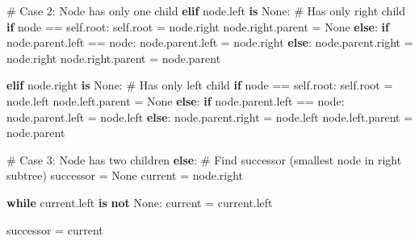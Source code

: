\documentclass[
  nswissgerman,
  a4paper,
  DIV=11,
  numbers=noendperiod,
  ngerman]{scrreprt}
\newenvironment{Shaded}{\begin{snugshade}}{\end{snugshade}}
\newcommand{\CommentTok}[1]{\textcolor[rgb]{0.37,0.37,0.37}{#1}}
\newcommand{\ControlFlowTok}[1]{\textcolor[rgb]{0.00,0.23,0.31}{\textbf{#1}}}
\newcommand{\KeywordTok}[1]{\textcolor[rgb]{0.00,0.23,0.31}{\textbf{#1}}}
\newcommand{\NormalTok}[1]{\textcolor[rgb]{0.00,0.23,0.31}{#1}}
\newcommand{\OperatorTok}[1]{\textcolor[rgb]{0.37,0.37,0.37}{#1}}
\newcommand{\VariableTok}[1]{\textcolor[rgb]{0.07,0.07,0.07}{#1}}
\begin{document}
\begin{Shaded}
\begin{Highlighting}[numbers=left,,]
        \CommentTok{\# Case 2: Node has only one child}
        \ControlFlowTok{elif}\NormalTok{ node.left }\KeywordTok{is} \VariableTok{None}\NormalTok{:  }\CommentTok{\# Has only right child}
            \ControlFlowTok{if}\NormalTok{ node }\OperatorTok{==} \VariableTok{self}\NormalTok{.root:}
                \VariableTok{self}\NormalTok{.root }\OperatorTok{=}\NormalTok{ node.right}
\NormalTok{                node.right.parent }\OperatorTok{=} \VariableTok{None}
            \ControlFlowTok{else}\NormalTok{:}
                \ControlFlowTok{if}\NormalTok{ node.parent.left }\OperatorTok{==}\NormalTok{ node:}
\NormalTok{                    node.parent.left }\OperatorTok{=}\NormalTok{ node.right}
                \ControlFlowTok{else}\NormalTok{:}
\NormalTok{                    node.parent.right }\OperatorTok{=}\NormalTok{ node.right}
\NormalTok{                node.right.parent }\OperatorTok{=}\NormalTok{ node.parent}
        
        \ControlFlowTok{elif}\NormalTok{ node.right }\KeywordTok{is} \VariableTok{None}\NormalTok{:  }\CommentTok{\# Has only left child}
            \ControlFlowTok{if}\NormalTok{ node }\OperatorTok{==} \VariableTok{self}\NormalTok{.root:}
                \VariableTok{self}\NormalTok{.root }\OperatorTok{=}\NormalTok{ node.left}
\NormalTok{                node.left.parent }\OperatorTok{=} \VariableTok{None}
            \ControlFlowTok{else}\NormalTok{:}
                \ControlFlowTok{if}\NormalTok{ node.parent.left }\OperatorTok{==}\NormalTok{ node:}
\NormalTok{                    node.parent.left }\OperatorTok{=}\NormalTok{ node.left}
                \ControlFlowTok{else}\NormalTok{:}
\NormalTok{                    node.parent.right }\OperatorTok{=}\NormalTok{ node.left}
\NormalTok{                node.left.parent }\OperatorTok{=}\NormalTok{ node.parent}
        
        \CommentTok{\# Case 3: Node has two children}
        \ControlFlowTok{else}\NormalTok{:}
            \CommentTok{\# Find successor (smallest node in right subtree)}
\NormalTok{            successor }\OperatorTok{=} \VariableTok{None}
\NormalTok{            current }\OperatorTok{=}\NormalTok{ node.right}
            
            \ControlFlowTok{while}\NormalTok{ current.left }\KeywordTok{is} \KeywordTok{not} \VariableTok{None}\NormalTok{:}
\NormalTok{                current }\OperatorTok{=}\NormalTok{ current.left}
            
\NormalTok{            successor }\OperatorTok{=}\NormalTok{ current}
            

\end{Highlighting}
\end{Shaded}
\end{document}
